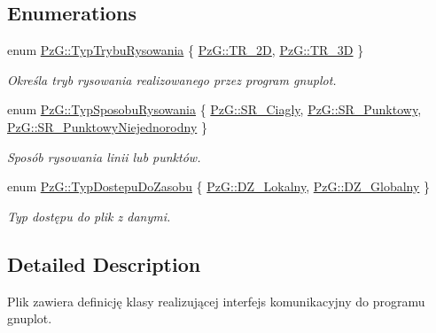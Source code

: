 \subsection*{Enumerations}
\begin{DoxyCompactItemize}
\item 
enum \mbox{\hyperlink{namespace_pz_g_aef59d70a0ee2eab473790613c3628944}{Pz\+G\+::\+Typ\+Trybu\+Rysowania}} \{ \mbox{\hyperlink{namespace_pz_g_aef59d70a0ee2eab473790613c3628944a5eb0cf8b3405e136f092efdb489d60c4}{Pz\+G\+::\+T\+R\+\_\+2D}}, 
\mbox{\hyperlink{namespace_pz_g_aef59d70a0ee2eab473790613c3628944a856e6b0fa6b8a9dc184c60cf27dcc5d2}{Pz\+G\+::\+T\+R\+\_\+3D}}
 \}
\begin{DoxyCompactList}\small\item\em Określa tryb rysowania realizowanego przez program {\ttfamily gnuplot}. \end{DoxyCompactList}\item 
enum \mbox{\hyperlink{namespace_pz_g_a53d89f50686ddd39301f9706cc1247dc}{Pz\+G\+::\+Typ\+Sposobu\+Rysowania}} \{ \mbox{\hyperlink{namespace_pz_g_a53d89f50686ddd39301f9706cc1247dca22656aba69ada1776d9522ff83f70546}{Pz\+G\+::\+S\+R\+\_\+\+Ciagly}}, 
\mbox{\hyperlink{namespace_pz_g_a53d89f50686ddd39301f9706cc1247dca307cba9b5669189418e9d595f0cc83a4}{Pz\+G\+::\+S\+R\+\_\+\+Punktowy}}, 
\mbox{\hyperlink{namespace_pz_g_a53d89f50686ddd39301f9706cc1247dca9c1082d7a4a130423bc49dd41e257317}{Pz\+G\+::\+S\+R\+\_\+\+Punktowy\+Niejednorodny}}
 \}
\begin{DoxyCompactList}\small\item\em Sposób rysowania linii lub punktów. \end{DoxyCompactList}\item 
enum \mbox{\hyperlink{namespace_pz_g_af74528dea7061dcb07cf44f315703cf4}{Pz\+G\+::\+Typ\+Dostepu\+Do\+Zasobu}} \{ \mbox{\hyperlink{namespace_pz_g_af74528dea7061dcb07cf44f315703cf4ab239a07233614b519b0f2f5ca8af7826}{Pz\+G\+::\+D\+Z\+\_\+\+Lokalny}}, 
\mbox{\hyperlink{namespace_pz_g_af74528dea7061dcb07cf44f315703cf4a21d511d2fe6c4e27e30ebe255405e6d9}{Pz\+G\+::\+D\+Z\+\_\+\+Globalny}}
 \}
\begin{DoxyCompactList}\small\item\em Typ dostępu do plik z danymi. \end{DoxyCompactList}\end{DoxyCompactItemize}


\subsection{Detailed Description}
Plik zawiera definicję klasy realizującej interfejs komunikacyjny do programu gnuplot. 